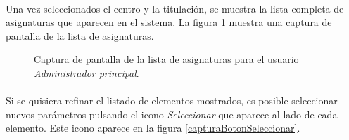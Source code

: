   \paragraph{}Una vez seleccionados el centro y la titulación, se muestra la
  lista completa de asignaturas que aparecen en el sistema. La figura
  \ref{capturaPantallaListaAsignaturasAdminPrincipal} muestra
  una captura de pantalla de la lista de asignaturas.

  \begin{figure}[!ht]
    \begin{center}
      \caption{Captura de pantalla de la lista de asignaturas para el usuario \textit{Administrador principal}.}
      \label{capturaPantallaListaAsignaturasAdminPrincipal}
    \end{center}
  \end{figure}

  \paragraph{}Si se quisiera refinar el listado de elementos mostrados, es
  posible seleccionar nuevos parámetros pulsando el icono \textit{Seleccionar}
  que aparece al lado de cada elemento. Este icono aparece en la figura
  \ref{capturaBotonSeleccionar}.
